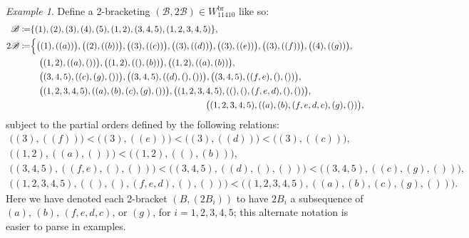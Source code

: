 \documentclass[11pt]{amsart}
\theoremstyle{definition}
\theoremstyle{remark}
\newtheorem{example}[theorem]{Example}
\theoremstyle{plain}
\newcommand{\sB}{\mathscr{B}}
\newcommand{\stB}{2\mathscr{B}}
\newcommand{\on}{\operatorname}
\newcommand{\br}{{\on{br}}}
\begin{document}
\begin{example}
\label{ex:2bracketing_examples}
Define a 2-bracketing $(\sB,\stB) \in W_{11410}^\br$ like so:
\begin{align}
\sB \coloneqq &\{(1),(2),(3),(4),(5),(1,2),(3,4,5),(1,2,3,4,5)\},
\\
\stB \coloneqq &\Bigl\{\bigl((1),((a))\bigr),
\bigl((2),((b))\bigr),
\bigl((3),((c))\bigr),
\bigl((3),((d))\bigr),
\bigl((3),((e))\bigr),
\bigl((3),((f))\bigr),
\bigl((4),((g))\bigr),
\nonumber\\
&\quad \bigl((1,2),((a),())\bigr),
\bigl((1,2),((),(b))\bigr),
\bigl((1,2),((a),(b))\bigr),
\nonumber\\
&\quad \bigl((3,4,5),((c),(g),())\bigr),
\bigl((3,4,5),((d),(),())\bigr),
\bigl((3,4,5),((f,e),(),())\bigr),
\nonumber\\
&\quad \bigl((1,2,3,4,5),((a),(b),(c),(g),())\bigr),
\bigl((1,2,3,4,5),((),(),(f,e,d),(),())\bigr),
\nonumber\\
&\hspace{2.75in}
\bigl((1,2,3,4,5),((a),(b),(f,e,d,c),(g),())\bigr),
\nonumber
\end{align}
subject to the partial orders defined by the following relations:
\begin{gather}
\bigl((3),((f))\bigr) < \bigl((3),((e))\bigr) < \bigl((3),((d))\bigr) < \bigl((3),((c))\bigr),
\\
\bigl((1,2),((a),())\bigr) < \bigl((1,2),((),(b))\bigr),
\nonumber\\
\bigl((3,4,5),((f,e),(),())\bigr) < \bigl((3,4,5),((d),(),())\bigr) < \bigl((3,4,5),((c),(g),())\bigr),
\nonumber\\
\bigl((1,2,3,4,5),((),(),(f,e,d),(),())\bigr) < \bigl((1,2,3,4,5),((a),(b),(c),(g),())\bigr).
\nonumber
\end{gather}
Here we have denoted each 2-bracket $(B,(2B_i))$ to have $2B_i$ a subsequence of $(a)$, $(b)$, $(f,e,d,c)$, or $(g)$, for $i = 1,2,3,4,5$; this alternate notation is easier to parse in examples.


\end{example}
\end{document}
